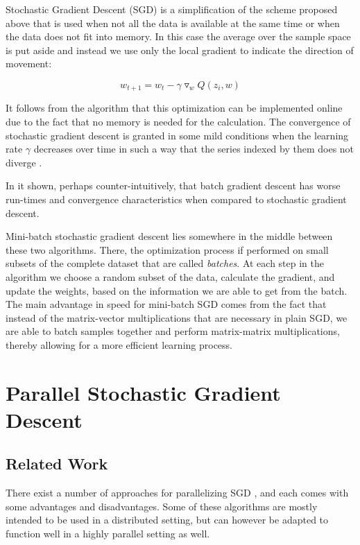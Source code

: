 \documentclass[11pt,a4paper]{article}
\begin{document}
Stochastic Gradient Descent (SGD) is a simplification of the scheme proposed above that is used when not all the data is available at the same time or when the data does not fit into memory. In this case the average over the sample space is put aside and instead we use only the local gradient to indicate the direction of movement:

\begin{equation}
w_{t + 1} = w_t - \gamma  \triangledown_w Q(z_i, w)
\end{equation} 

It follows from the algorithm that this optimization can be implemented online due to the fact that  no memory is needed for the calculation. The convergence of stochastic gradient descent is granted in  some mild conditions when the learning rate $\gamma$ decreases over time in such a way that the series  indexed by them does not diverge \citep{bottou2010large}. 

In \citep{wilson2003general} it shown, perhaps counter-intuitively, that batch gradient descent has worse run-times and convergence characteristics when compared to stochastic gradient descent.

Mini-batch stochastic gradient descent lies somewhere in the middle between these two algorithms. There, the optimization process if performed on small subsets of the complete dataset that are called \textit{batches}. At each step in the algorithm we choose a random subset of the data, calculate the gradient, and update the weights, based on the information we are able to get from the batch. The main advantage in speed for mini-batch SGD comes from the fact that instead of the matrix-vector multiplications that are necessary in plain SGD, we are able to batch samples together and perform matrix-matrix multiplications, thereby allowing for a more efficient learning process.

\section{Parallel Stochastic Gradient Descent}
\subsection{Related Work}

There exist a number of approaches for parallelizing SGD \citep{zinkevich2010parallelized, recht2011hogwild, dekel2012optimal}, and each comes with some advantages and disadvantages. Some of these algorithms are mostly intended to be used in a distributed setting, but can however be adapted to function well in a highly parallel setting as well. 
\end{document}
